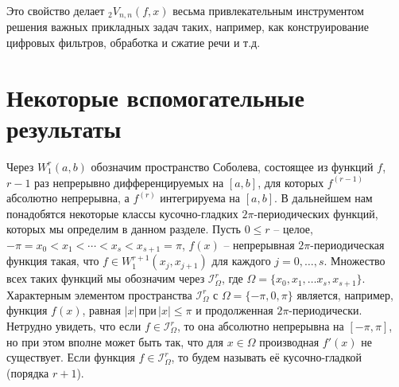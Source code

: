 Это свойство делает $_2V_{n,n}(f,x)$ весьма привлекательным инструментом решения важных прикладных задач таких, например, как конструирование цифровых фильтров, обработка и сжатие речи и т.д.






\section{Некоторые вспомогательные результаты}\label{s2}


Через $W_1^r(a,b)$ обозначим пространство Соболева, состоящее из функций $f$, $r-1$ раз непрерывно дифференцируемых на $[a,b]$, для которых $f^{(r-1)}$ абсолютно непрерывна, а $f^{(r)}$ интегрируема на $[a,b]$. В дальнейшем нам понадобятся некоторые классы кусочно-гладких \linebreak $2\pi$-периодических функций, которых мы определим в данном разделе. Пусть $0\le r$ -- целое, $-\pi=x_0<x_1<\cdots<x_s<x_{s+1}=\pi$, $f(x)$ -- непрерывная $2\pi$-периодическая функция такая, что $f\in W_1^{r+1}(x_j,x_{j+1})$ для каждого $j=0,\ldots,s$. Множество всех таких функций мы обозначим  через $\mathcal{ I}^r_\Omega$, где $\Omega=\{x_0,x_1,\ldots x_s,x_{s+1}\}$.
 Характерным элементом пространства $\mathcal{ I}^r_\Omega$   с $\Omega=\{-\pi,0,\pi\}$ является, например, функция   $f(x)$, равная $|x|\,\text{при}\, |x|\le \pi$ и продолженная $2\pi$-периодически.
Нетрудно увидеть, что если $f\in  \mathcal{ I}^r_\Omega$, то она абсолютно непрерывна на $[-\pi,\pi]$, но при этом вполне может быть так, что для  $x\in\Omega$ производная $f'(x)$  не существует. Если функция $f\in \mathcal{ I}^r_\Omega$, то будем называть её кусочно-гладкой (порядка $r+1$).

